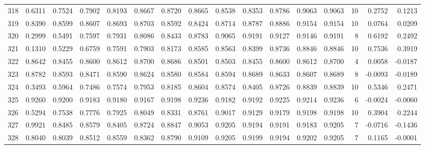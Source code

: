 \begin{tabular}{lrrrrrrrrrrrrrrr}
318 &      0.6311 &  0.7524 &  0.7902 &  0.8193 &  0.8667 &  0.8720 &  0.8665 &  0.8538 &  0.8353 &  0.8786 &   0.9063 &     0.9063 &     10 &                    0.2752 &                     0.1213 \\
319 &      0.8390 &  0.8599 &  0.8607 &  0.8693 &  0.8703 &  0.8592 &  0.8424 &  0.8714 &  0.8787 &  0.8886 &   0.9154 &     0.9154 &     10 &                    0.0764 &                     0.0209 \\
320 &      0.2999 &  0.5491 &  0.7597 &  0.7931 &  0.8086 &  0.8433 &  0.8783 &  0.9065 &  0.9191 &  0.9127 &   0.9146 &     0.9191 &      8 &                    0.6192 &                     0.2492 \\
321 &      0.1310 &  0.5229 &  0.6759 &  0.7591 &  0.7903 &  0.8173 &  0.8585 &  0.8563 &  0.8399 &  0.8736 &   0.8846 &     0.8846 &     10 &                    0.7536 &                     0.3919 \\
322 &      0.8642 &  0.8455 &  0.8600 &  0.8612 &  0.8700 &  0.8686 &  0.8501 &  0.8503 &  0.8455 &  0.8600 &   0.8612 &     0.8700 &      4 &                    0.0058 &                    -0.0187 \\
323 &      0.8782 &  0.8593 &  0.8471 &  0.8590 &  0.8624 &  0.8580 &  0.8584 &  0.8594 &  0.8689 &  0.8633 &   0.8607 &     0.8689 &      8 &                   -0.0093 &                    -0.0189 \\
324 &      0.3493 &  0.5964 &  0.7486 &  0.7574 &  0.7953 &  0.8185 &  0.8604 &  0.8574 &  0.8405 &  0.8726 &   0.8839 &     0.8839 &     10 &                    0.5346 &                     0.2471 \\
325 &      0.9260 &  0.9200 &  0.9183 &  0.9180 &  0.9167 &  0.9198 &  0.9236 &  0.9182 &  0.9192 &  0.9225 &   0.9214 &     0.9236 &      6 &                   -0.0024 &                    -0.0060 \\
326 &      0.5294 &  0.7538 &  0.7776 &  0.7925 &  0.8049 &  0.8331 &  0.8761 &  0.9017 &  0.9129 &  0.9179 &   0.9198 &     0.9198 &     10 &                    0.3904 &                     0.2244 \\
327 &      0.9921 &  0.8485 &  0.8579 &  0.8405 &  0.8724 &  0.8847 &  0.9053 &  0.9205 &  0.9194 &  0.9191 &   0.9183 &     0.9205 &      7 &                   -0.0716 &                    -0.1436 \\
328 &      0.8040 &  0.8039 &  0.8512 &  0.8559 &  0.8362 &  0.8790 &  0.9109 &  0.9205 &  0.9199 &  0.9194 &   0.9202 &     0.9205 &      7 &                    0.1165 &                    -0.0001 \\

\end{tabular}
